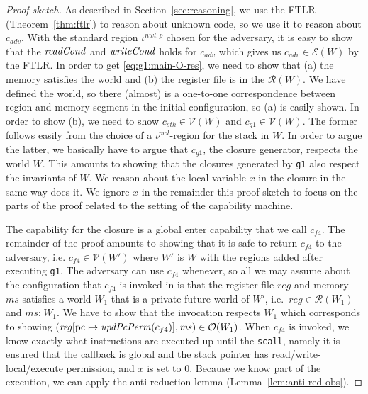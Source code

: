 \documentclass[format=acmsmall, review=true, screen=true]{acmart}
\renewcommand{\sectionname}{Section}
\newcommand{\var}[1]{\mathit{#1}}
\newcommand{\hs}{\var{ms}}
\newcommand{\ms}{\hs}
\newcommand{\pcreg}{\mathrm{pc}}
\newcommand{\reg}{\var{reg}}
\newcommand{\heap}{\var{mem}}
\newcommand{\adv}{\var{adv}}
\newcommand{\stk}{\var{stk}}
\newcommand{\plainfun}[2]{
  \ifthenelse{\equal{#2}{}}
  {\mathit{#1}}
  {\mathit{#1}(#2)}
}
\newcommand{\updatePcPerm}[1]{\plainfun{updPcPerm}{#1}}
\newcommand{\readCond}[1]{\plainfun{readCond}{#1}}
\newcommand{\writeCond}[1]{\plainfun{writeCond}{#1}}
\newcommand{\heapSat}[3][\heap]{#1 :_{#2} #3}
\newcommand{\memSat}[3][n]{\heapSat[#2]{#1}{#3}}
\newcommand{\asmType}{\plaindom{AsmType}}
\newcommand{\plaindom}[1]{\mathrm{#1}}
\newcommand{\intr}[2]{\mathcal{#1}}
\newcommand{\valueintr}[1]{\intr{V}{#1}}
\newcommand{\exprintr}[1]{\intr{E}{#1}}
\newcommand{\regintr}[1]{\intr{R}{#1}}
\newcommand{\stdvr}{\valueintr{\asmType}}
\newcommand{\stder}{\exprintr{\asmType}}
\newcommand{\stdrr}{\regintr{\asmType}}
\newcommand{\observations}{\mathcal{O}}
\newenvironment{toplas}{}{}
\begin{document}
\begin{toplas}
\begin{proof}[Proof sketch]
  As described in \sectionname~\ref{sec:reasoning}, we use the FTLR (Theorem~\ref{thm:ftlr}) to reason about unknown code, so we use it to reason about $c_\adv$.
  With the standard region $\iota^{nwl,p}$ chosen for the adversary, it is easy to show that the $\readCond{}$ and $\writeCond{}$ holds for $c_\adv$ which gives us $c_\adv \in \stder(W)$ by the FTLR.
  In order to get \eqref{eq:g1:main-O-res}, we need to show that (a) the memory satisfies the world and (b) the register file is in the $\stdrr(W)$.
  We have defined the world, so there (almost) is a one-to-one correspondence between region and memory segment in the initial configuration, so (a) is easily shown.
  In order to show (b), we need to show $c_\stk \in \stdvr(W)$ and $c_{g1} \in \stdvr(W)$.
  The former follows easily from the choice of a $\iota^{pwl}$-region for the stack in $W$.
  In order to argue the latter, we basically have to argue that $c_{g1}$, the closure generator, respects the world $W$.
  This amounts to showing that the closures generated by \texttt{g1} also respect the invariants of $W$.
  We reason about the local variable $x$ in the closure in the same way \citet{Dreyer:jfp12} does it.
  We ignore $x$ in the remainder this proof sketch to focus on the parts of the proof related to the setting of the capability machine.

  The capability for the closure is a global enter capability that we call $c_{f4}$.
  The remainder of the proof amounts to showing that it is safe to return $c_{f4}$ to the adversary, i.e.
  $c_{f4} \in \stdvr(W')$ where $W'$ is $W$ with the regions added after executing \texttt{g1}.
  The adversary can use $c_{f4}$ whenever, so all we may assume about the configuration that $c_{f4}$ is invoked in is that the register-file $\reg$ and memory $\ms$ satisfies a world $W_1$ that is a private future world of $W'$, i.e.\ $\reg \in \stdrr(W_1)$ and $\memSat[]{\ms}{W_1}$.
  We have to show that the invocation respects $W_1$ which corresponds to showing $(\reg[\pcreg \mapsto \updatePcPerm{c_{f4}}],\ms) \in \observations(W_1)$.
  When $c_{f4}$ is invoked, we know exactly what instructions are executed up until the \texttt{scall}, namely it is ensured that the callback is global and the stack pointer has read/write-local/execute permission, and $x$ is set to 0.
  Because we know part of the execution, we can apply the anti-reduction lemma (Lemma~\ref{lem:anti-red-obs}).
  

\end{proof}
\end{toplas}
\end{document}
